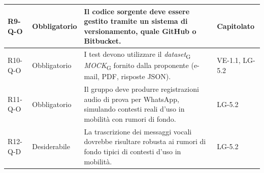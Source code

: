 {\begin{longtable}{|>{\raggedright\arraybackslash}p{1.8cm}|>{\raggedright\arraybackslash}p{2.3cm}|>{\raggedright\arraybackslash}p{6.6cm}|>{\raggedright\arraybackslash}p{3.1cm}|}
    \mbox{R9-Q-O} & Obbligatorio & Il codice sorgente deve essere gestito tramite un sistema di versionamento, quale GitHub o Bitbucket. & \mbox{Capitolato} \\ \hline
    \mbox{R10-Q-O} & Obbligatorio & I test devono utilizzare il \textit{dataset}\textsubscript{G} \textit{MOCK}\textsubscript{G} fornito dalla proponente (e-mail, PDF, risposte JSON). & \mbox{VE-1.1}, \mbox{LG-5.2} \\ \hline
    \mbox{R11-Q-O} & Obbligatorio & Il gruppo deve produrre registrazioni audio di prova per WhatsApp, simulando contesti reali d'uso in mobilità con rumori di fondo. & \mbox{LG-5.2} \\ \hline
    \mbox{R12-Q-D} & Desiderabile & La trascrizione dei messaggi vocali dovrebbe risultare robusta ai rumori di fondo tipici di contesti d'uso in mobilità. & \mbox{LG-5.2} \\ \hline
    \end{longtable}
}